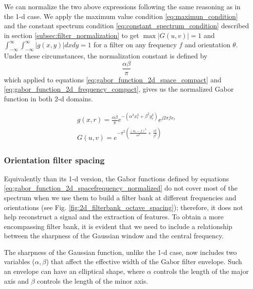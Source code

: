 \documentclass[journal]{IEEEtran}
\begin{document}
We can normalize the two above expressions following the same reasoning as in the 1-d case. We apply the maximum value condition \eqref{eq:maximun_condition} and the constant spectrum condition \eqref{eq:constant_spectrum_condition} described in section \ref{subsec:filter_normalization} to get $\max{|G(u,v)|} = 1$ and $\int_{-\infty}^{\infty} \int_{-\infty}^{\infty} |g(x,y)| dx dy = 1$ for a filter on any frequency $f$ and orientation $\theta$. 
Under these circumstances, the normalization constant is defined by
\begin{equation}\label{eq:normalization_constant_2d}
    \frac{\alpha \beta}{\pi}
\end{equation}
which applied to equations \eqref{eq:gabor_function_2d_space_compact}  and \eqref{eq:gabor_function_2d_frequency_compact}, gives us the normalized Gabor function in both 2-d domains. 

\begin{equation}\label{eq:gabor_function_2d_spacefrequency_normalized}
    \begin{gathered}
        g(x, r) = \frac{\alpha \beta}{\pi} e ^{-\left(\alpha^2 x_r^2 + \beta^2 y_r^2\right)} e ^{j 2 \pi f x_r } \\
        G(u, v) =   e ^{- \pi^2 \left(\frac{\left( u_r - f\right)^2}{\alpha^2} + \frac{v_r^2}{\beta^2}\right)} 
     \end{gathered}
\end{equation}

\subsubsection{Orientation filter spacing}

Equivalently than its 1-d version, the Gabor functions defined by equations \eqref{eq:gabor_function_2d_spacefrequency_normalized} do not cover most of the spectrum when we use them to build a filter bank at different frequencies and orientations (see Fig. \ref{fig:2d_filterbank_octave_spacing}); therefore, it does not help reconstruct a signal and the extraction of features. To obtain a more encompassing filter bank, it is evident that we need to include a relationship between the sharpness of the Gaussian window and the central frequency. 

The sharpness of the Gaussian function, unlike the 1-d case, now includes two variables ($\alpha, \beta$) that affect the effective width of the Gabor filter envelope. Such an envelope can have an elliptical shape, where $\alpha $ controls the length of the major axis and $\beta$ controls the length of the minor axis. 
\end{document}
